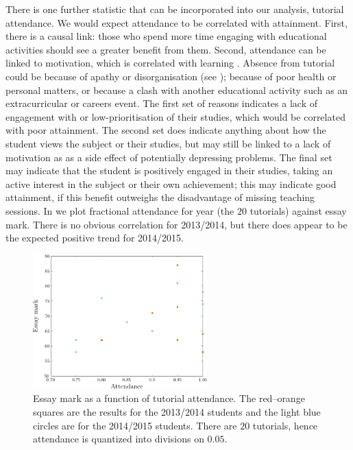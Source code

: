 There is one further statistic that can be incorporated into our analysis, tutorial attendance. We would expect attendance to be correlated with attainment. First, there is a causal link: those who spend more time engaging with educational activities should see a greater benefit from them. Second, attendance can be linked to motivation, which is correlated with learning \citep[e.g.,][chapter 4]{Ramsden1992}. Absence from tutorial could be because of apathy or disorganisation (see ); because of poor health or personal matters, or because a clash with another educational activity such as an extracurricular or careers event. The first set of reasons indicates a lack of engagement with or low-prioritisation of their studies, which would be correlated with poor attainment. The second set does indicate anything about how the student views the subject or their studies, but may still be linked to a lack of motivation as as a side effect of potentially depressing problems. The final set may indicate that the student is positively engaged in their studies, taking an active interest in the subject or their own achievement; this may indicate good attainment, if this benefit outweighs the disadvantage of missing teaching sessions. In \figref{} we plot fractional attendance for year (the $20$ tutorials) against essay mark. There is no obvious correlation for 2013/2014, but there does appear to be the expected positive trend for 2014/2015.
\begin{figure}
  \centering
   \includegraphics[width=0.6\textwidth]{./figs/Fig_attend}
\caption{Essay mark as a function of tutorial attendance. The red--orange squares are the results for the 2013/2014 students and the light blue circles are for the 2014/2015 students. There are $20$ tutorials, hence attendance is quantized into divisions on $0.05$.}
  \label{fig:attend}
\end{figure}

